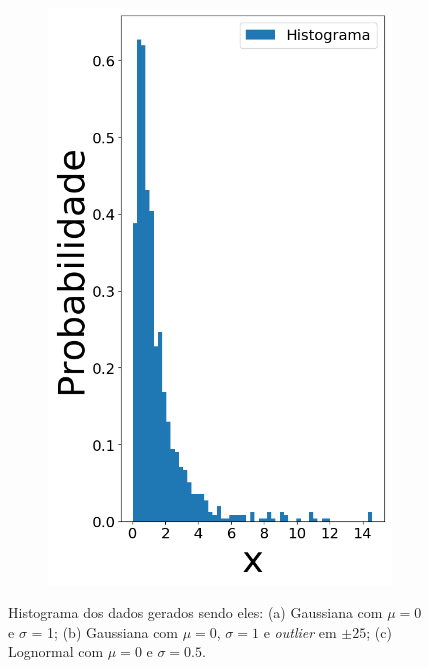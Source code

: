 \begin{figure}[H]
\begin{subfigure}[b]{0.27\textwidth}
		\includegraphics[width=\linewidth]{./figuras/datalognormal_0}
		\caption{}
		\label{fig:randlog}
	\end{subfigure}
	
	\caption{Histograma dos dados gerados sendo eles: (a) Gaussiana com $\mu = 0$ e $\sigma$ = 1; (b) Gaussiana com $\mu = 0$, $\sigma = 1$ e \textit{outlier} em $\pm 25$; (c) Lognormal com $\mu = 0$ e $\sigma = 0.5$.}
	\label{fig:data}
\end{figure}


